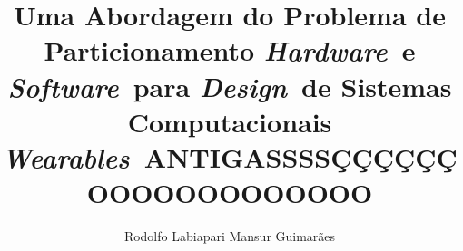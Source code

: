 \documentclass[bind,a4paper]{mythesis}
\newcommand{\Hardware }{\textit{Hardware}}
\newcommand{\Software }{\textit{Software}}
\newcommand{\Wearables}{\textit{Wearables}}
\newcommand{\Design}   {\textit{Design}}
\begin{document}
\let\cleardoublepage\clearpage
\title{Uma Abordagem do Problema de Particionamento \Hardware\ e \Software\ para \Design\ de Sistemas Computacionais \Wearables\ ANTIGASSSSÇÇÇÇÇÇOOOOOOOOOOOOO}
\author{Rodolfo Labiapari Mansur Guimarães}%

\begin{frontmatter}
	
\end{frontmatter}

\begin{mainmatter}
  	
	\let\cleardoublepage\clearpage
	
	
	
	
	
\end{mainmatter}

\begin{appendices}
\begin{flushleft}

\end{flushleft}
  	
\end{appendices}
\let\cleardoublepage\clearpage
\begin{backmatter}
	
\end{backmatter}

\end{document}
